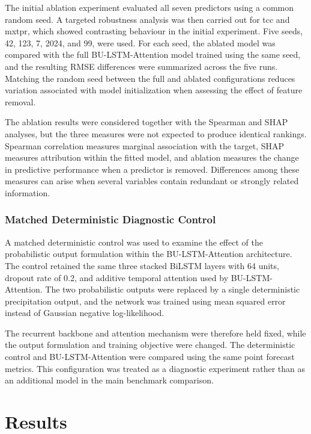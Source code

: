 \documentclass[referee,pdflatex,sn-basic]{sn-jnl}%
\theoremstyle{thmstyleone}%
\theoremstyle{thmstyletwo}%
\theoremstyle{thmstylethree}%
\begin{document}
The initial ablation experiment evaluated all seven predictors using a common random seed. A targeted robustness analysis was then carried out for tcc and mxtpr, which showed contrasting behaviour in the initial experiment. Five seeds, 42, 123, 7, 2024, and 99, were used. For each seed, the ablated model was compared with the full BU-LSTM-Attention model trained using the same seed, and the resulting RMSE differences were summarized across the five runs. Matching the random seed between the full and ablated configurations reduces variation associated with model initialization when assessing the effect of feature removal.

The ablation results were considered together with the Spearman and SHAP analyses, but the three measures were not expected to produce identical rankings. Spearman correlation measures marginal association with the target, SHAP measures attribution within the fitted model, and ablation measures the change in predictive performance when a predictor is removed. Differences among these measures can arise when several variables contain redundant or strongly related information.

\subsubsection{Matched Deterministic Diagnostic Control}
\label{sec:deterministic_control}

A matched deterministic control was used to examine the effect of the probabilistic output formulation within the BU-LSTM-Attention architecture. The control retained the same three stacked BiLSTM layers with 64 units, dropout rate of 0.2, and additive temporal attention used by BU-LSTM-Attention. The two probabilistic outputs were replaced by a single deterministic precipitation output, and the network was trained using mean squared error instead of Gaussian negative log-likelihood.

The recurrent backbone and attention mechanism were therefore held fixed, while the output formulation and training objective were changed. The deterministic control and BU-LSTM-Attention were compared using the same point forecast metrics. This configuration was treated as a diagnostic experiment rather than as an additional model in the main benchmark comparison.

\section{Results}
\label{sec:results}
\end{document}
